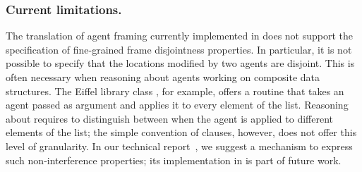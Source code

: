 \subsubsection{Current limitations.}
The translation of agent framing currently implemented in \AutoProof does not support the specification of fine-grained frame disjointness properties.
In particular, it is not possible to specify that the locations modified by two agents are disjoint.
This is often necessary when reasoning about agents working on composite data structures.
The Eiffel library class , for example, offers a routine  that takes an agent passed as argument and applies it to every element of the list.
Reasoning about  requires to distinguish between when the agent is applied to different elements of the list; the simple convention of  clauses, however, does not offer this level of granularity.
In our technical report~\cite{NordioCalcagnoMeyerMueller08c}, we suggest a mechanism to express such non-interference properties; its implementation in \AutoProof is part of future work.
